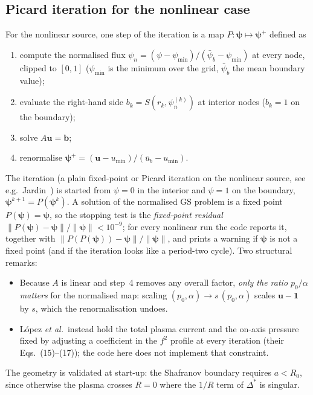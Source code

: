 \documentclass[11pt,a4paper]{article}
\newcommand{\Dstar}{\Delta^{\!*}}
\newcommand{\pn}{\psi_n}
\begin{document}
\subsection{Picard iteration for the nonlinear case}\label{sec:picarddef}
For the nonlinear source, one step of the iteration is a map $P:\bm\psi\mapsto\bm\psi^{+}$ defined as
\begin{enumerate}[nosep]
\item compute the normalised flux $\pn=(\psi-\psi_{\min})/(\bar\psi_b-\psi_{\min})$ at every node, clipped to $[0,1]$ ($\psi_{\min}$ is the minimum over the grid, $\bar\psi_b$ the mean boundary value);
\item evaluate the right-hand side $b_k=S(r_k,\pn^{(k)})$ at interior nodes ($b_k=1$ on the boundary);
\item solve $A\bm u=\bm b$;
\item renormalise $\bm\psi^+=(\bm u-u_{\min})/(\bar u_b-u_{\min})$.
\end{enumerate}
The iteration (a plain fixed-point or Picard iteration on the nonlinear source, see e.g.\ Jardin~\cite{jardin2010}) is started from $\psi=0$ in the interior and $\psi=1$ on the boundary, $\bm\psi^{k+1}=P(\bm\psi^k)$. A solution of the normalised GS problem is a fixed point $P(\bm\psi)=\bm\psi$, so the stopping test is the \emph{fixed-point residual} $\|P(\bm\psi)-\bm\psi\|/\|\bm\psi\|<10^{-9}$; for every nonlinear run the code reports it, together with $\|P(P(\bm\psi))-\bm\psi\|/\|\bm\psi\|$, and prints a warning if $\bm\psi$ is not a fixed point (and if the iteration looks like a period-two cycle). 
Two structural remarks:
\begin{itemize}[nosep]
\item Because $A$ is linear and step~4 removes any overall factor, \emph{only the ratio $p_0/\alpha$ matters} for the normalised map: scaling $(p_0,\alpha)\to s\,(p_0,\alpha)$ scales $\bm u-\bm 1$ by $s$, which the renormalisation undoes.
\item L\'opez \emph{et al.}\ instead hold the total plasma current and the on-axis pressure fixed by adjusting a coefficient in the $f^2$ profile at every iteration (their Eqs.~(15)--(17)); the code here does not implement that constraint.
\end{itemize}
The geometry is validated at start-up: the Shafranov boundary requires $a<R_0$, since otherwise the plasma crosses $R=0$ where the $1/R$ term of $\Dstar$ is singular.

\end{document}
